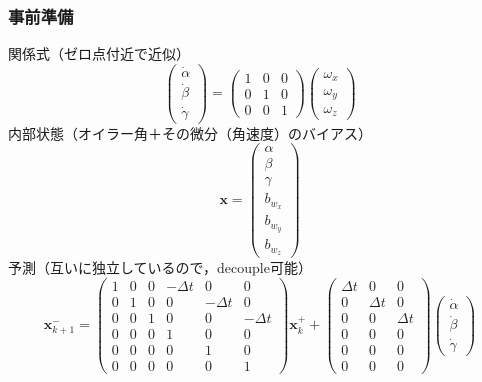 \subsubsection{事前準備}
関係式（ゼロ点付近で近似）
\begin{equation}
  \begin{pmatrix}
    \dot{\alpha}\\
    \dot{\beta}\\
    \dot{\gamma}
  \end{pmatrix} =
  \begin{pmatrix}
    1 & 0 & 0 \\
    0 & 1 & 0 \\
    0 & 0 & 1
  \end{pmatrix}
  \begin{pmatrix}
    \omega_x\\
    \omega_y\\
    \omega_z
  \end{pmatrix}
\end{equation}
内部状態（オイラー角＋その微分（角速度）のバイアス）
\begin{equation}
  \boldsymbol{x} =
  \begin{pmatrix}
    \alpha\\
    \beta\\
    \gamma\\
    b_{w_x}\\
    b_{w_y}\\
    b_{w_z}
  \end{pmatrix}
\end{equation}
予測（互いに独立しているので，decouple可能）
{\tiny
  \begin{equation}
    \boldsymbol{x}_{k+1}^{-} =
    \begin{pmatrix}
      1 & 0 & 0 & -\Delta t & 0 & 0\\
      0 & 1 & 0 & 0 & -\Delta t & 0\\
      0 & 0 & 1 & 0 & 0 & -\Delta t\\
      0 & 0 & 0 & 1 & 0 & 0\\
      0 & 0 & 0 & 0 & 1 & 0\\
      0 & 0 & 0 & 0 & 0 & 1
    \end{pmatrix}
    \boldsymbol{x}_{k}^{+} +
    \begin{pmatrix}
      \Delta t & 0 & 0\\
      0 & \Delta t & 0\\
      0 & 0 & \Delta t\\
      0 & 0 & 0\\
      0 & 0 & 0\\
      0 & 0 & 0
    \end{pmatrix}
    \begin{pmatrix}
      \dot{\alpha}\\
      \dot{\beta}\\
      \dot{\gamma}
    \end{pmatrix}
  \end{equation}
}
